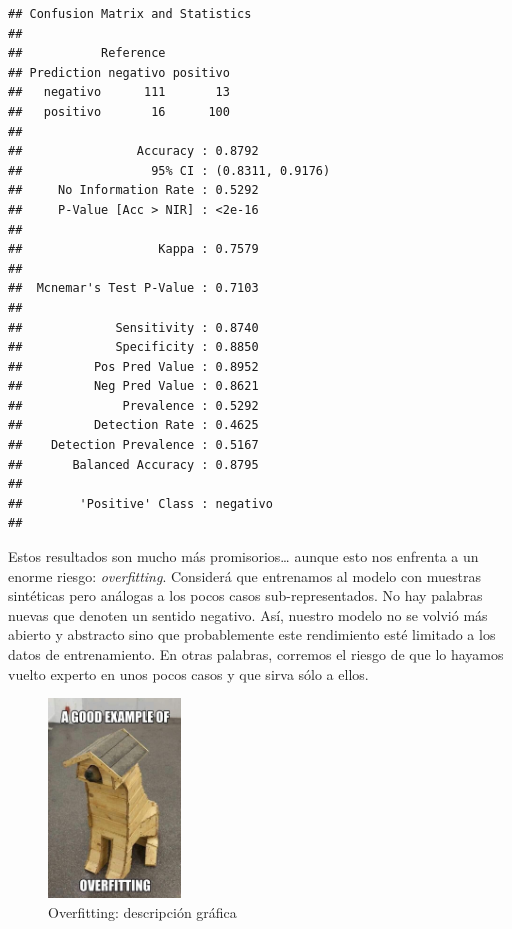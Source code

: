 \documentclass[
]{book}
\begin{document}
\begin{verbatim}
## Confusion Matrix and Statistics
## 
##           Reference
## Prediction negativo positivo
##   negativo      111       13
##   positivo       16      100
##                                           
##                Accuracy : 0.8792          
##                  95% CI : (0.8311, 0.9176)
##     No Information Rate : 0.5292          
##     P-Value [Acc > NIR] : <2e-16          
##                                           
##                   Kappa : 0.7579          
##                                           
##  Mcnemar's Test P-Value : 0.7103          
##                                           
##             Sensitivity : 0.8740          
##             Specificity : 0.8850          
##          Pos Pred Value : 0.8952          
##          Neg Pred Value : 0.8621          
##              Prevalence : 0.5292          
##          Detection Rate : 0.4625          
##    Detection Prevalence : 0.5167          
##       Balanced Accuracy : 0.8795          
##                                           
##        'Positive' Class : negativo        
## 
\end{verbatim}

Estos resultados son mucho más promisorios\ldots{} aunque esto nos enfrenta a un enorme riesgo: \emph{overfitting}. Considerá que entrenamos al modelo con muestras sintéticas pero análogas a los pocos casos sub-representados. No hay palabras nuevas que denoten un sentido negativo. Así, nuestro modelo no se volvió más abierto y abstracto sino que probablemente este rendimiento esté limitado a los datos de entrenamiento. En otras palabras, corremos el riesgo de que lo hayamos vuelto experto en unos pocos casos y que sirva sólo a ellos.

\begin{figure}
\centering
\includegraphics[width=\textwidth,height=2.08333in]{images/over1.jpg}
\caption{Overfitting: descripción gráfica}
\end{figure}
\end{document}
